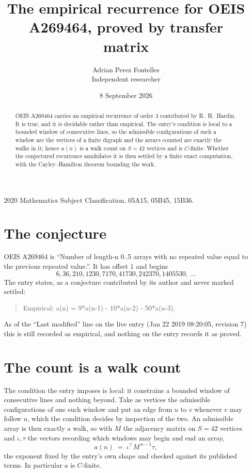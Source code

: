 \documentclass[11pt,a4paper]{article}
\title{The empirical recurrence for OEIS A269464, proved by transfer matrix}
\author{Adrian Perez Fontelles\\ \small Independent researcher}
\date{8 September 2026}
\theoremstyle{plain}
\theoremstyle{definition}
\begin{document}
\maketitle

\begin{abstract}
OEIS A269464 carries an empirical recurrence of order $3$ contributed by R.~H.~Hardin. It is
true, and it is decidable rather than empirical. The entry's condition is local to a bounded window of consecutive lines, so
the admissible configurations of such a window are the vertices of a finite digraph and the
arrays counted are exactly the walks in it; hence $a(n)$ is a walk count on $S=42$ vertices
and is $C$-finite. Whether the conjectured recurrence annihilates it is then settled by a
finite exact computation, with the Cayley--Hamilton theorem bounding the work.
\end{abstract}

\noindent\small 2020 Mathematics Subject Classification. 05A15, 05B45, 15B36.\normalsize

\section{The conjecture}

OEIS A269464 is ``Number of length-n 0..5 arrays with no repeated value equal to the previous repeated value.''. It has offset $1$ and begins
\[
6, 36, 210, 1230, 7170, 41730, 242370, 1405530,\ \dots
\]
The entry states, as a conjecture contributed by its author and never marked settled:
\begin{quote}
Empirical: a(n) = 9*a(n-1) - 10*a(n-2) - 50*a(n-3).
\end{quote}
As of the ``Last modified'' line on the live entry (Jan 22 2019 08:20:05, revision 7) this is still
recorded as empirical, and nothing on the entry records it as proved.

\section{The count is a walk count}

The condition the entry imposes is local: it constrains a bounded window of consecutive lines and nothing beyond. Take as
vertices the admissible configurations of one such window and put an edge from $u$ to $v$
whenever $v$ may follow $u$, which the condition decides by inspection of the two. An
admissible array is then exactly a walk, so with $M$ the adjacency matrix on $S=42$ vertices
and $\iota,\tau$ the vectors recording which windows may begin and end an array,
\[
a(n)\;=\;\iota^{\!\top}M^{\,n-1}\tau ,
\]
the exponent fixed by the entry's own shape and checked against its published terms. In
particular $a$ is $C$-finite.
\end{document}
